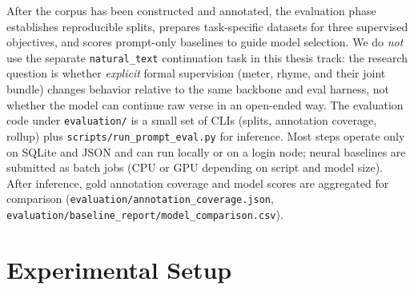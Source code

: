 


After the corpus has been constructed and annotated, the evaluation phase establishes reproducible splits, prepares task-specific datasets for three supervised objectives, and scores prompt-only baselines to guide model selection.
We do \emph{not} use the separate \texttt{natural\_text} continuation task in this thesis track: the research question is whether \emph{explicit} formal supervision (meter, rhyme, and their joint bundle) changes behavior relative to the same backbone and eval harness, not whether the model can continue raw verse in an open-ended way.
The evaluation code under \texttt{evaluation/} is a small set of CLIs (splits, annotation coverage, rollup) plus \texttt{scripts/run\_prompt\_eval.py} for inference.
Most steps operate only on SQLite and JSON and can run locally or on a login node; neural baselines are submitted as batch jobs (CPU or GPU depending on script and model size).
After inference, gold annotation coverage and model scores are aggregated for comparison (\texttt{evaluation/annotation\_coverage.json}, \texttt{evaluation/baseline\_report/model\_comparison.csv}).

\section{Experimental Setup}

